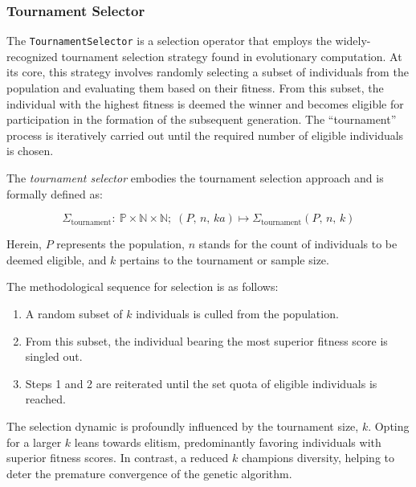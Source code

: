 \subsubsection{Tournament Selector}
\label{sec:keen:operators:selection:tournament}
  The \texttt{TournamentSelector} is a selection operator that employs the 
  widely-recognized tournament selection strategy found in evolutionary 
  computation.
  At its core, this strategy involves randomly selecting a subset of 
  individuals from the population and evaluating them based on their fitness. 
  From this subset, the individual with the highest fitness is deemed the 
  winner and becomes eligible for participation in the formation of the 
  subsequent generation.
  The \enquote{tournament} process is iteratively carried out until the 
  required number of eligible individuals is chosen.

  \begin{definition}
  \label{def:keen:op:select:tournament}
    The \emph{tournament selector} embodies the tournament selection approach 
    and is formally defined as:

    \begin{equation}
      \Sigma_\mathrm{tournament} :\: 
        \mathbb{P} \times \mathbb{N} \times \mathbb{N};\;
      (P,\, n,\, ka) \mapsto \Sigma_\mathrm{tournament}(P,\, n,\, k)
    \end{equation}

    Herein, \(P\) represents the population, \(n\) stands for the count of 
    individuals to be deemed eligible, and \(k\) pertains to the tournament or 
    sample size.

    The methodological sequence for selection is as follows:

    \begin{enumerate}
      \item A random subset of \(k\) individuals is culled from the population.
      \item From this subset, the individual bearing the most superior fitness 
        score is singled out.
      \item Steps 1 and 2 are reiterated until the set quota of eligible 
        individuals is reached.
    \end{enumerate}
  \end{definition}

  \begin{remark}
    The selection dynamic is profoundly influenced by the tournament size, 
    \(k\).
    Opting for a larger \(k\) leans towards elitism, predominantly favoring 
    individuals with superior fitness scores.
    In contrast, a reduced \(k\) champions diversity, helping to deter the 
    premature convergence of the genetic algorithm.
  \end{remark}


